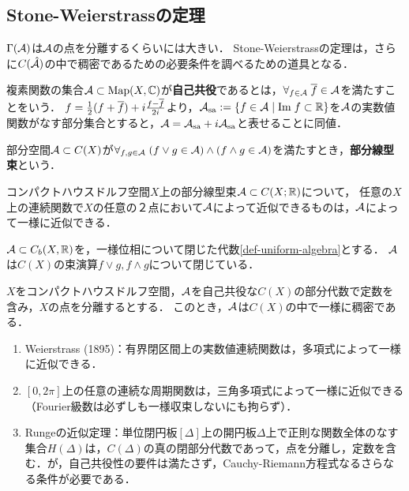 \documentclass[uplatex,dvipdfmx]{jsreport}
\begin{document}
\subsection{Stone-Weierstrassの定理}

\begin{tcolorbox}[colframe=ForestGreen, colback=ForestGreen!10!white,breakable,colbacktitle=ForestGreen!40!white,coltitle=black,fonttitle=\bfseries\sffamily,
title=]
    $\Gamma(\mathcal{A})$は$\mathcal{A}$の点を分離するくらいには大きい．
    Stone-Weierstrassの定理は，さらに$C(\hat{\mathcal{A}})$の中で稠密であるための必要条件を調べるための道具となる．
\end{tcolorbox}

\begin{definition}
    複素関数の集合$\mathcal{A}\subset\mathrm{Map}(X,\mathbb{C})$が\textbf{自己共役}であるとは，$\forall_{f\in\mathcal{A}}\;\overline{f}\in\mathcal{A}$を満たすことをいう．
    $f=\frac{1}{2}(f+\overline{f})+i\frac{f-\overline{f}}{2i}$より，$\mathcal{A}_{\mathrm{sa}}:=\left\{f\in\mathcal{A}\mid\mathrm{Im}\; f\subset\mathbb{R}\right\}$を$\mathcal{A}$の実数値関数がなす部分集合とすると，$\mathcal{A}=\mathcal{A}_{\mathrm{sa}}+i\mathcal{A}_{\mathrm{sa}}$と表せることに同値．
\end{definition}

\begin{definition}
    部分空間$\mathcal{A}\subset C(X)$が$\forall_{f,g\in\mathcal{A}}\;(f\lor g\in\mathcal{A})\land(f\land g\in\mathcal{A})$を満たすとき，\textbf{部分線型束}という．
\end{definition}

\begin{lemma}
    コンパクトハウスドルフ空間$X$上の部分線型束$\mathcal{A}\subset C(X;\mathbb{R})$について，
    任意の$X$上の連続関数で$X$の任意の２点において$\mathcal{A}$によって近似できるものは，$\mathcal{A}$によって一様に近似できる．
\end{lemma}

\begin{lemma}
    $\mathcal{A}\subset C_b(X,\mathbb{R})$を，一様位相について閉じた代数\ref{def-uniform-algebra}とする．
    $\mathcal{A}$は$C(X)$の束演算$f\lor g,f\land g$について閉じている．
\end{lemma}

\begin{theorem}[Stone (1948)]
    $X$をコンパクトハウスドルフ空間，$\mathcal{A}$を自己共役な$C(X)$の部分代数で定数を含み，$X$の点を分離するとする．
    このとき，$\mathcal{A}$は$C(X)$の中で一様に稠密である．
\end{theorem}
\begin{example}\mbox{}
    \begin{enumerate}
        \item Weierstrass (1895)：有界閉区間上の実数値連続関数は，多項式によって一様に近似できる．
        \item $[0,2\pi]$上の任意の連続な周期関数は，三角多項式によって一様に近似できる（Fourier級数は必ずしも一様収束しないにも拘らず）．
        \item Rungeの近似定理：単位閉円板$[\Delta]$上の開円板$\Delta$上で正則な関数全体のなす集合$H(\Delta)$は，$C(\Delta)$の真の閉部分代数であって，点を分離し，定数を含む．が，自己共役性の要件は満たさず，Cauchy-Riemann方程式なるさらなる条件が必要である．
    \end{enumerate}
\end{example}
\end{document}
